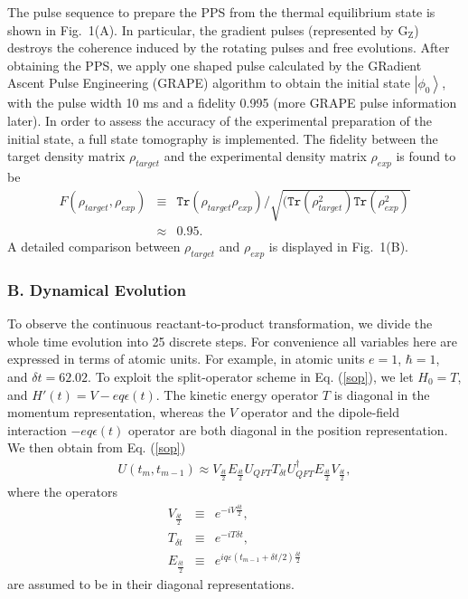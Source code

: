 \documentclass[twocolumn,showpacs,twoside,10pt,prl]{revtex4}
\begin{document}
 The pulse sequence to prepare the PPS from the thermal equilibrium state is shown in Fig.~1(A). In particular,
 the gradient pulses (represented by G$_\text{Z}$) destroys the coherence induced by the rotating pulses and free evolutions. After obtaining the PPS,
 we apply one shaped pulse calculated by the GRadient Ascent Pulse Engineering (GRAPE) algorithm \cite{grape1-2,grape2-2,grape3-2} to obtain the initial state $\left\vert \phi_{0} \right\rangle$, with the pulse width 10 ms and a fidelity 0.995 (more GRAPE pulse information later). In order to assess the accuracy of the experimental preparation of the initial state, a full state tomography \cite{tomography} is implemented. The fidelity \cite{fidelity} between the target density matrix $\rho_{target}$ and the experimental density matrix $\rho_{exp}$ is found to be
\begin{eqnarray}\label{pps}
F(\rho_{target}, \rho_{exp})&\equiv& \texttt{Tr}(\rho_{target}\rho_{exp})/\sqrt{(\texttt{Tr}(\rho_{target}^2)\texttt{Tr}(\rho_{exp}^2)} \nonumber \\
&\approx & 0.95.
\end{eqnarray}
A detailed comparison between $\rho_{target}$ and $\rho_{exp}$ is displayed in Fig.~1(B).

\subsubsection*{\textbf{B. Dynamical Evolution}}

To observe the continuous reactant-to-product transformation, we divide the whole time evolution into 25 discrete steps. For convenience
all variables here are expressed in terms of atomic units.  For example, in atomic units $e=1$, $\hbar=1$, and $\delta t  = 62.02$.
  To exploit the split-operator scheme in Eq. (\ref{sop}), we let $H_0=T$, and $H'(t)=V-eq\epsilon(t)$.  The kinetic energy operator $T$ is diagonal in the momentum representation, whereas the $V$ operator and the dipole-field interaction $-eq\epsilon(t)$ operator are both diagonal in the position representation.  We then obtain from Eq. (\ref{sop})
\begin{eqnarray}
 U(t_m,t_{m-1})\approx  V_{\frac{\delta t}{2}}E_{\frac{\delta t}{2}}U_{QFT}T_{\delta t}U_{QFT}^{\dagger}E_{\frac{\delta t}{2}}V_{\frac{\delta t}{2}},
 \end{eqnarray}
where the operators
\begin{eqnarray}\label{potential}
V_{\frac{\delta t}{2}} &\equiv &e^{-i {V}\frac{\delta t}{2}},\\
T_{\delta t} &\equiv &e^{-i  {T}\delta t},\\
E_{\frac{\delta t}{2}} &\equiv&e^{i {q}\varepsilon(t_{m-1}+\delta t/2)\frac{\delta t}{2}}
\end{eqnarray}
are assumed to be in their diagonal representations.
\end{document}
